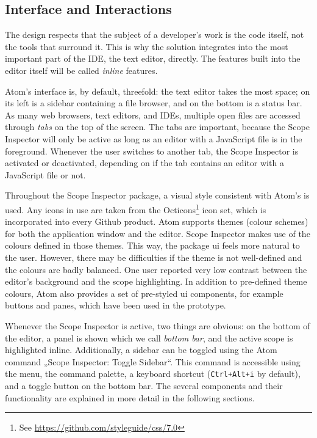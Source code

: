 \subsection{Interface and
Interactions}\label{interface-and-interactions}

The design respects that the subject of a developer’s work is the code
itself, not the tools that surround it. This is why the solution
integrates into the most important part of the IDE, the text editor,
directly. The features built into the editor itself will be called
\emph{inline} features.

Atom’s interface is, by default, threefold: the text editor takes the
most space; on its left is a sidebar containing a file browser, and on
the bottom is a status bar. As many web browsers, text editors, and
IDEs, multiple open files are accessed through \emph{tabs} on the top of
the screen. The tabs are important, because the Scope Inspector will
only be active as long as an editor with a JavaScript file is in the
foreground. Whenever the user switches to another tab, the Scope
Inspector is activated or deactivated, depending on if the tab contains
an editor with a JavaScript file or not.

Throughout the Scope Inspector package, a visual style consistent with
Atom’s is used. Any icons in use are taken from the
Octicons\footnote{See \url{https://github.com/styleguide/css/7.0}} icon
set, which is incorporated into every Github product. Atom supports
themes (colour schemes) for both the application window and the editor.
Scope Inspector makes use of the colours defined in those themes. This
way, the package \ac{ui} feels more natural to the user. However, there
may be difficulties if the theme is not well-defined and the colours are
badly balanced. One user reported very low contrast between the editor’s
background and the scope highlighting. In addition to pre-defined theme
colours, Atom also provides a set of pre-styled \ac{ui} components, for
example buttons and panes, which have been used in the prototype.

Whenever the Scope Inspector is active, two things are obvious: on the
bottom of the editor, a panel is shown which we call \emph{bottom bar},
and the active scope is highlighted inline. Additionally, a sidebar can
be toggled using the Atom command „Scope Inspector: Toggle Sidebar“.
This command is accessible using the menu, the command palette, a
keyboard shortcut (\texttt{Ctrl+Alt+i} by default), and a toggle button
on the bottom bar. The several components and their functionality are
explained in more detail in the following sections.

